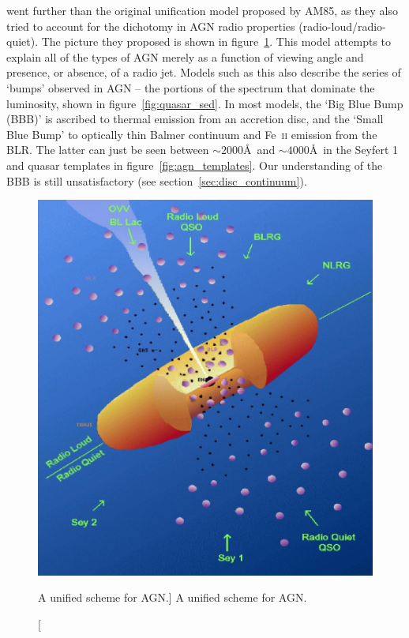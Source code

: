 \citet[][UP95]{UP95} went further than the original unification model
proposed by AM85, as they also tried to account for the dichotomy in 
AGN radio properties (radio-loud/radio-quiet).
The picture they proposed is shown in figure~\ref{fig:unification}.
This model attempts to explain all of the types of AGN 
merely as a function of viewing angle
and presence, or absence, of a radio jet. Models such as this also 
describe the series of `bumps' observed in AGN -- the portions
of the spectrum that dominate the luminosity, shown in figure~\ref{fig:quasar_sed}. 
In most models, the `Big Blue Bump (BBB)' is ascribed to thermal 
emission from an accretion disc, and the `Small Blue Bump' to optically 
thin Balmer continuum and Fe~\textsc{ii} emission from the BLR.
The latter can just be seen between $\sim2000$\AA\ and 
$\sim4000$\AA\ in the Seyfert 1 and 
quasar templates in figure~\ref{fig:agn_templates}.
Our understanding of the BBB is still unsatisfactory 
(see section~\ref{sec:disc_continuum}).

\begin{figure}
\centering
\includegraphics[width=1.0\textwidth]{figures/01-intro/up95.png}
\caption
[A unified scheme for AGN.]
{
A unified scheme for AGN.
} 
\label{fig:unification}
\end{figure} 

